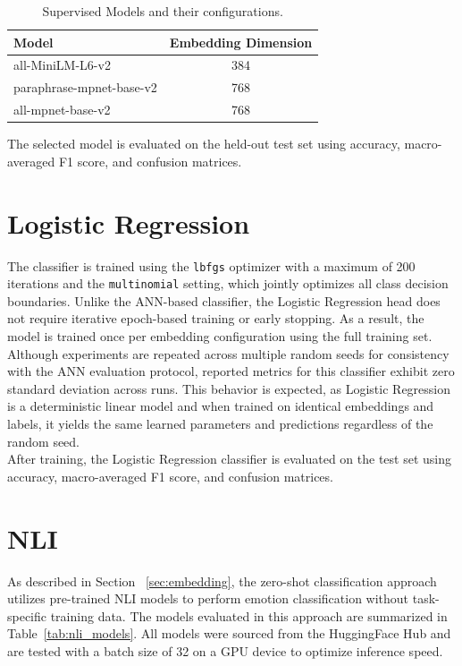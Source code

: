 \documentclass[runningheads]{llncs}
\begin{document}
\vspace{-2em}

\begin{table}[H]
\centering
\caption{Supervised Models and their configurations.}
\label{tab:supervised_models}
\begin{tabular}{lc}
\hline
\textbf{Model} & \textbf{Embedding Dimension} \\
\hline
all-MiniLM-L6-v2 & 384 \\
paraphrase-mpnet-base-v2 & 768 \\
all-mpnet-base-v2 & 768 \\
\hline
\end{tabular}
\end{table} 

\vspace{-2em}
\noindent
The selected model is evaluated on the held-out test set using accuracy, macro-averaged F1 score, and confusion matrices. 


\section{Logistic Regression}


The classifier is trained using the \texttt{lbfgs} optimizer with a maximum of 200 iterations and the \texttt{multinomial} setting, which jointly optimizes all class decision boundaries. Unlike the ANN-based classifier, the Logistic Regression head does not require iterative epoch-based training or early stopping. As a result, the model is trained once per embedding configuration using the full training set. Although experiments are repeated across multiple random seeds for consistency with the ANN evaluation protocol, reported metrics for this classifier exhibit zero standard deviation across runs. This behavior is expected, as Logistic Regression is a deterministic linear model and when trained on identical embeddings and labels, it yields the same learned parameters and predictions regardless of the random seed.
\\
After training, the Logistic Regression classifier is evaluated on the test set using accuracy, macro-averaged F1 score, and confusion matrices.


\section{NLI}

As described in Section ~\ref{sec:embedding}, the zero-shot classification approach utilizes pre-trained NLI models to perform emotion classification without task-specific training data. The models evaluated in this approach are summarized in Table~\ref{tab:nli_models}. All models were sourced from the HuggingFace Hub and are tested with a batch size of 32 on a GPU device to optimize inference speed.
\end{document}
